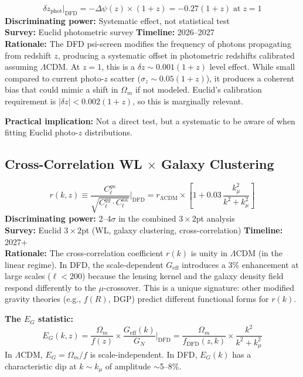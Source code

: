 \documentclass[12pt]{article}
\newcommand{\LCDM}{$\Lambda$CDM}
\begin{document}
\begin{predbox}
\begin{equation}
\boxed{
\delta z_\mathrm{phot}\bigg|_\mathrm{DFD} = -\Delta\psi(z) \times (1+z) = -0.27(1+z)\;\text{at}\;z=1
}
\end{equation}
\textbf{Discriminating power:} Systematic effect, not statistical test\\
\textbf{Survey:} Euclid photometric survey \quad\textbf{Timeline:} 2026--2027\\
\textbf{Rationale:} The DFD psi-screen modifies the frequency of photons propagating from redshift $z$, producing a systematic offset in photometric redshifts calibrated assuming \LCDM{}. At $z=1$, this is a $\delta z \sim 0.001(1+z)$ level effect. While small compared to current photo-$z$ scatter ($\sigma_z \sim 0.05(1+z)$), it produces a coherent bias that could mimic a shift in $\Omega_m$ if not modeled. Euclid's calibration requirement is $|\delta z| < 0.002(1+z)$, so this is marginally relevant.

\medskip\noindent
\textbf{Practical implication:} Not a direct test, but a systematic to be aware of when fitting Euclid photo-$z$ distributions.
\end{predbox}

\subsection{Cross-Correlation WL $\times$ Galaxy Clustering}

\begin{predbox}
\begin{equation}
\boxed{
r(k,z) \equiv \frac{C_\ell^{g\kappa}}{\sqrt{C_\ell^{gg} \cdot C_\ell^{\kappa\kappa}}} \bigg|_\mathrm{DFD} = r_\mathrm{\Lambda CDM} \times \left[1 + 0.03\,\frac{k_\mu^2}{k^2+k_\mu^2}\right]
}
\end{equation}
\textbf{Discriminating power:} 2--4$\sigma$ in the combined $3\times2$pt analysis\\
\textbf{Survey:} Euclid $3\times2$pt (WL, galaxy clustering, cross-correlation) \quad\textbf{Timeline:} 2027+\\
\textbf{Rationale:} The cross-correlation coefficient $r(k)$ is unity in \LCDM{} (in the linear regime). In DFD, the scale-dependent $G_\mathrm{eff}$ introduces a 3\% enhancement at large scales ($\ell < 200$) because the lensing kernel and the galaxy density field respond differently to the $\mu$-crossover. This is a unique signature: other modified gravity theories (e.g., $f(R)$, DGP) predict different functional forms for $r(k)$.

\medskip\noindent
\textbf{The $E_G$ statistic:}
\begin{equation}
E_G(k,z) = \frac{\Omega_m}{f(z)} \times \frac{G_\mathrm{eff}(k)}{G_N} \bigg|_\mathrm{DFD} = \frac{\Omega_m}{f_\mathrm{DFD}(z,k)} \times \frac{k^2}{k^2+k_\mu^2}
\end{equation}
In \LCDM, $E_G = \Omega_m/f$ is scale-independent. In DFD, $E_G(k)$ has a characteristic dip at $k \sim k_\mu$ of amplitude $\sim$5--8\%.
\end{predbox}
\end{document}
